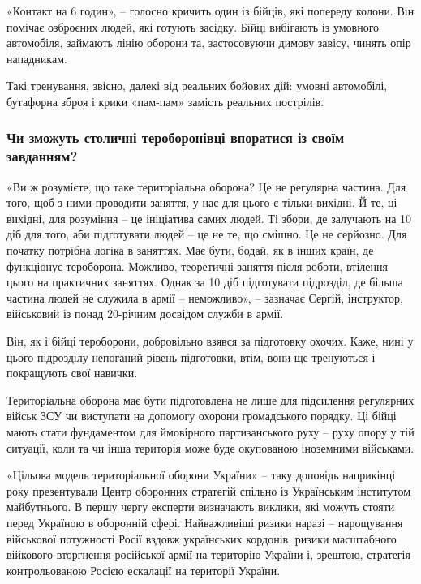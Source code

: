 «Контакт на 6 годин», – голосно кричить один із бійців, які попереду колони.
Він помічає озброєних людей, які готують засідку. Бійці вибігають із умовного
автомобіля, займають лінію оборони та, застосовуючи димову завісу, чинять опір
нападникам.

Такі тренування, звісно, далекі від реальних бойових дій: умовні автомобілі,
бутафорна зброя і крики «пам-пам» замість реальних пострілів.


\subsubsection{Чи зможуть столичні тероборонівці впоратися із своїм завданням?}

«Ви ж розумієте, що таке територіальна оборона? Це не регулярна частина. Для
того, щоб з ними проводити заняття, у нас для цього є тільки вихідні. Й те, ці
вихідні, для розуміння – це ініціатива самих людей. Ті збори, де залучають на
10 діб для того, аби підготувати людей – це не те, що смішно. Це не серйозно.
Для початку потрібна логіка в заняттях. Має бути, бодай, як в інших країн, де
функціонує тероборона. Можливо, теоретичні заняття після роботи, втілення цього
на практичних заняттях. Однак за 10 діб підготувати підрозділ, де більша
частина людей не служила в армії – неможливо», – зазначає Сергій, інструктор,
військовий із понад 20-річним досвідом служби в армії.

Він, як і бійці тероборони, добровільно взявся за підготовку охочих. Каже, нині
у цього підрозділу непоганий рівень підготовки, втім, вони ще тренуються і
покращують свої навички.

Територіальна оборона має бути підготовлена не лише для підсилення регулярних
військ ЗСУ чи виступати на допомогу охорони громадського порядку. Ці бійці
мають стати фундаментом для ймовірного партизанського руху – руху опору у тій
ситуації, коли та чи інша територія може буде окупованою іноземними військами.

«Цільова модель територіальної оборони України» – таку доповідь наприкінці року
презентували Центр оборонних стратегій спільно із Українським інститутом
майбутнього. В першу чергу експерти визначають виклики, які можуть стояти перед
Україною в оборонній сфері. Найважливіші ризики наразі – нарощування військової
потужності Росії вздовж українських кордонів, ризики масштабного війкового
вторгнення російської армії на територію України і, зрештою, стратегія
контрольованою Росією ескалації на території України.

